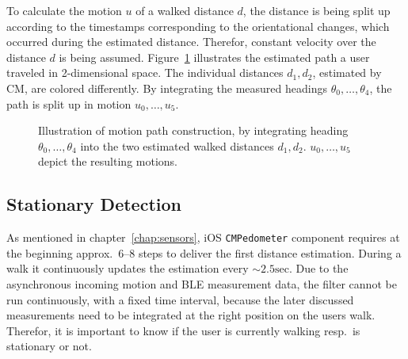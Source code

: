 To calculate the motion $u$ of a walked distance $d$, the distance is being split up according to the timestamps corresponding to the orientational changes, which occurred during the estimated distance. Therefor, constant velocity over the distance $d$ is being assumed. Figure~\ref{fig:mm_path} illustrates the estimated path a user traveled in 2-dimensional space. The individual distances $d_1, d_2$, estimated by \acs{CM}, are colored differently. By integrating the measured headings $\theta_0, \ldots, \theta_4$, the path is split up in motion $u_0, \ldots, u_5$.


\begin{figure}
\caption{Illustration of motion path construction, by integrating heading $\theta_0, \ldots, \theta_4$ into the two estimated walked distances $d_1, d_2$. $u_0, \ldots, u_5$ depict the resulting motions.}
\label{fig:mm_path}
\end{figure}


\subsection{Stationary Detection}\label{sec:algo_stationary}
As mentioned in chapter~\ref{chap:sensors}, iOS \texttt{CMPedometer} component requires at the beginning approx.\ 6--8 steps to deliver the first distance estimation. During a walk it continuously updates the estimation every $\sim 2.5\text{sec}$. Due to the asynchronous incoming motion and \acs{BLE} measurement data, the filter cannot be run continuously, with a fixed time interval, because the later discussed measurements need to be integrated at the right position on the users walk. Therefor, it is important to know if the user is currently walking resp.\ is stationary or not.

